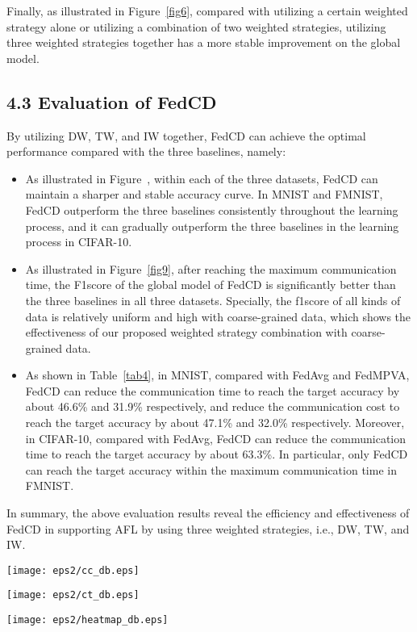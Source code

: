 \documentclass[twoside,twocolumn]{article}
\begin{document}
	Finally, as illustrated in Figure~\ref{fig6}, compared with utilizing a certain weighted strategy alone or utilizing a combination of two weighted strategies, utilizing three weighted strategies together has a more stable improvement on the global model.	
%
%
%
\subsection{4.3 Evaluation of FedCD}
By utilizing DW, TW, and IW together, FedCD can achieve the optimal performance compared with the three baselines, namely:
\begin{itemize}
	\item As illustrated in Figure~, within each of the three datasets, FedCD can maintain a sharper and stable accuracy curve. In MNIST and FMNIST, FedCD outperform the three baselines consistently throughout the learning process, and it can gradually outperform the three baselines in the learning process in CIFAR-10.
%
	\item As illustrated in Figure~\ref{fig9}, after reaching the maximum communication time, the F1score of the global model of FedCD is significantly better than the three baselines in all three datasets. Specially, the f1score of all kinds of data is relatively uniform and high with coarse-grained data, which shows the effectiveness of our proposed weighted strategy combination with coarse-grained data.
%
	\item As shown in Table~\ref{tab4}, in MNIST, compared with FedAvg and FedMPVA, FedCD can reduce the communication time to reach the target accuracy by about 46.6\% and 31.9\% respectively, and reduce the communication cost to reach the target accuracy by about 47.1\% and 32.0\% respectively. Moreover, in CIFAR-10, compared with FedAvg, FedCD can reduce the communication time to reach the target accuracy by about 63.3\%. In particular, only FedCD can reach the target accuracy within the maximum communication time in FMNIST.
\end{itemize}
In summary, the above evaluation results reveal the efficiency and effectiveness of FedCD in supporting AFL by using three weighted strategies, i.e., DW, TW, and IW.\\
\begin{figure*}
\centerline{\texttt{[image: eps2/cc\_db.eps]}}
\caption{The accuracy curve of FedCD with the CommunicationCost compared with three baselines in MNIST, CIFAR-10, and FMNIST with the Coarse-gained data.} \label{fig7}
\end{figure*}
%
\begin{figure*}
\centerline{\texttt{[image: eps2/ct\_db.eps]}}
\caption{The accuracy curve of FedCD with the CommunicationTime compared with three baselines in MNIST, CIFAR-10, and FMNIST with the Coarse-gained data.} \label{fig8}
\end{figure*}
%
\begin{figure*}
\centerline{\texttt{[image: eps2/heatmap\_db.eps]}}
\caption{The F1score heatmap of various samples reaching the specified CommunicaitonTime of FedCD compared with the three baselines in MNIST, FMNIST, and CIFAR-10 with the Coarse-gained data.} \label{fig9}
\end{figure*}
%
\end{document}
